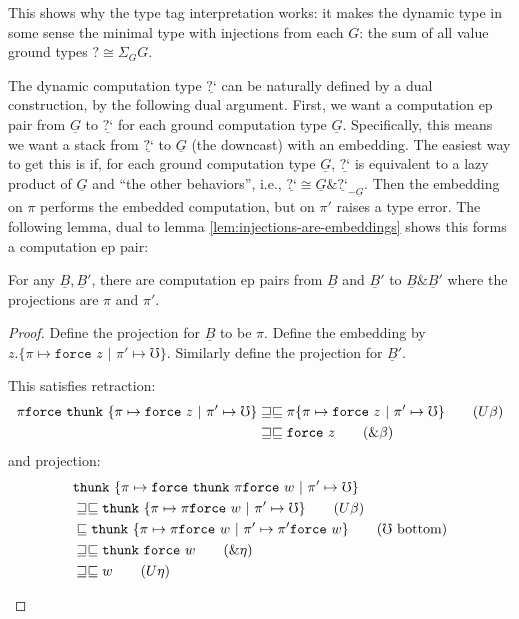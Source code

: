 \documentclass[acmsmall,screen,12pt]{acmart}
\renewcommand{\u}{\underline}
\newcommand{\pipe}{\,\,|\,\,}
\newcommand{\ltdyn}{\sqsubseteq}
\newcommand{\gtdyn}{\sqsupseteq}
\newcommand{\equidyn}{\mathrel{\gtdyn\ltdyn}}
\newcommand{\pair}[2]{\{ \pi \mapsto {#1} \pipe \pi' \mapsto {#2}\}}
\newcommand{\dync}{\u {\text{?`}}}
\newcommand{\err}{\mho}
\newcommand{\kw}[1]{\texttt{#1}\,\,}
\newcommand{\thunk}{\kw{thunk}}
\newcommand{\force}{\kw{force}}
\newcommand{\with}{\mathbin{\&}}
\begin{document}
This shows why the type tag interpretation works: it makes the dynamic
type in some sense the minimal type with injections from each $G$:
the sum of all value ground types $? \cong \Sigma_{G} G$.

The dynamic computation type $\dync$ can be naturally defined by a
dual construction, by the following dual argument.
%
First, we want a computation ep pair from $\u G$ to $\dync$ for each
ground computation type $\u G$.
%
Specifically, this means we want a stack from $\dync$ to $\u G$ (the
downcast) with an embedding.
%
The easiest way to get this is if, for each ground computation type
$\u G$, $\dync$ is equivalent to a lazy product of $\u G$ and ``the
other behaviors'', i.e., $\dync \cong \u G \with \dync_{-\u G}$.
%
Then the embedding on $\pi$ performs the embedded computation, but on
$\pi'$ raises a type error.
%
The following lemma, dual to lemma \ref{lem:injections-are-embeddings}
shows this forms a computation ep pair:

\begin{lemma}\label{lem:projections-are-projections}
  For any $\u B, \u B'$, there are computation ep pairs from $\u B$
  and $\u B'$ to $\u B \with \u B'$ where the projections are $\pi$
  and $\pi'$.
\end{lemma}
\begin{proof}
  Define the projection for $\u B$ to be $\pi$. Define the embedding
  by $z. \pair{\force z}{\err}$. Similarly define the projection for
  $\u B'$.
  \begin{longonly}
    This satisfies retraction:
    \begin{align*}
      \pi\force\thunk\pair{\force z}{\err}
      &\equidyn \pi\pair{\force z}{\err}\tag{$U\beta$}\\
      &\equidyn \force z\tag{$\with\beta$}
    \end{align*}
    and projection:
    \begin{align*}
      &\thunk\pair{\force\thunk\pi\force w}{\err}\\
      &\equidyn \thunk\pair{\pi\force w}{\err} \tag{$U\beta$}\\
      &\ltdyn \thunk\pair{\pi\force w}{\pi'\force w}\tag{$\err$ bottom}\\
      &\equidyn \thunk\force w\tag{$\with\eta$}\\
      &\equidyn w \tag{$U\eta$}
    \end{align*}
  \end{longonly}
\end{proof}
\end{document}
